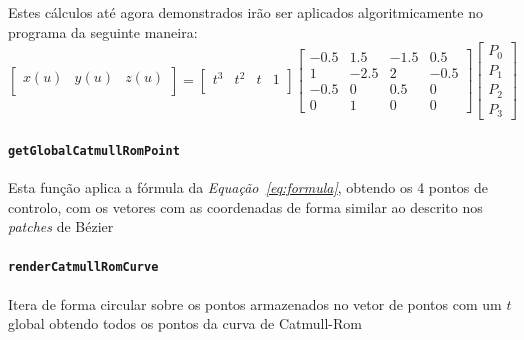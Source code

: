 Estes cálculos até agora demonstrados irão ser aplicados algoritmicamente no programa da seguinte maneira:
\begin{equation}	
\begin{bmatrix}
       x(u) & y(u) & z(u)             \\
\end{bmatrix} = 
\begin{bmatrix}
       t^{3} & t^{2} & t & 1          \\
\end{bmatrix}
\begin{bmatrix}
-0.5 & 1.5 & -1.5 & 0.5 \\
1 & -2.5 & 2 & -0.5     \\
-0.5 & 0 & 0.5 & 0      \\
0 & 1 & 0 & 0
\end{bmatrix}
\begin{bmatrix}
P_{0} \\
P_{1} \\
P_{2} \\
P_{3}
\end{bmatrix}
\label{eq:formula}
\end{equation}



\paragraph{\texttt{getGlobalCatmullRomPoint}}

Esta função aplica a fórmula da \emph{Equação~\ref{eq:formula}}, obtendo os
4 pontos de controlo, com os vetores com as coordenadas de forma similar ao
descrito nos \emph{patches} de Bézier  

\paragraph{\texttt{renderCatmullRomCurve}}

Itera de forma circular sobre os pontos armazenados no vetor de pontos com um
$t$ global obtendo todos os pontos da curva de Catmull-Rom




